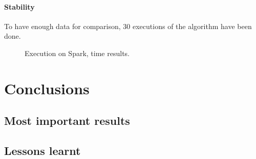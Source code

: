 \documentclass[11pt]{book} %
\begin{document}
      \subsubsection{Stability}

        To have enough data for comparison, $30$ executions of the algorithm have been done.

        \begin{figure}[!ht]
          \hfill
          \caption{Execution on Spark, time results.}
        \end{figure}







\chapter{Conclusions}
  \label{sec:conclusions}

  \section{Most important results}

  \section{Lessons learnt}



\newpage


\nocite{*}
\newpage
\printbibliography
\end{document}
